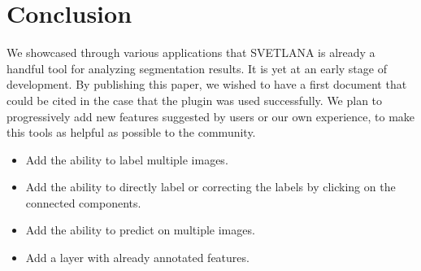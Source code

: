\documentclass{article}
\begin{document}
\section{Conclusion}
\label{sec:conclusion}

We showcased through various applications that SVETLANA is already a handful tool for analyzing segmentation results. 
It is yet at an early stage of development. By publishing this paper, we wished to have a first document that could be cited in the case that the plugin was used successfully. We plan to progressively add new features suggested by users or our own experience, to make this tools as helpful as possible to the community. 
\begin{itemize}
  \item Add the ability to label multiple images. 
  \item Add the ability to directly label or correcting the labels by clicking on the connected components. 
  \item Add the ability to predict on multiple images. 
  \item Add a layer with already annotated features.
\end{itemize}

\vfill
\pagebreak




\end{document}
